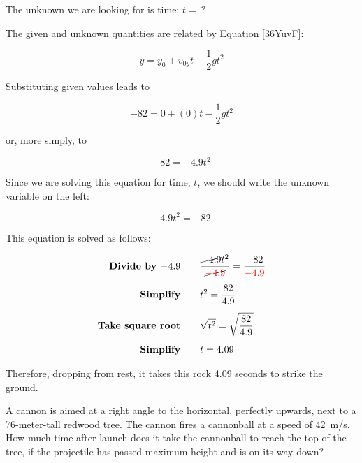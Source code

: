 \documentclass[dvipsnames]{article}
\numberwithin{equation}{section}
\numberwithin{figure}{section}
\begin{document}
\vspace{1em}

The unknown we are looking for is time: $t =\ ?$

\vspace{1em}

The given and unknown quantities are related by Equation \eqref{36YuvF}:

\begin{equation*}
    y = y_0 + v_{0y}t - \frac{1}{2}  g t^2
\end{equation*}

Substituting given values leads to 

\begin{equation*}
    -82 = 0 + (0) t - \frac{1}{2} g t^2
\end{equation*}

or, more simply, to

\begin{equation*}
    -82 = - 4.9 t^2
\end{equation*}

Since we are solving this equation for time, $t$, we should write the unknown variable on the left:

\begin{equation*}
    -4.9 t^2 = -82
\end{equation*}

This equation is solved as follows:

\begin{align*}
    \textbf{Divide by $-4.9$} \qquad & \frac{\cancel{-4.9} t^2}{\cancel{\mathbin{\color{red} -} \textcolor{red}{4.9}}} = \frac{-82}{\mathbin{\color{red} -} \textcolor{red}{4.9}}\\[1ex]
    \textbf{Simplify} \qquad & t^2 = \frac{82}{4.9}\\[1ex]
    \textbf{Take square root} \qquad & \sqrt{t^2} = \sqrt{\frac{82}{4.9}}\\[1ex]
    \textbf{Simplify} \qquad & t = 4.09
\end{align*}

Therefore, dropping from rest, it takes this rock 4.09 seconds to strike the ground.

\solutionEnd


\begin{example} \label{lB7EDG}
    A cannon is aimed at a right angle to the horizontal, perfectly upwards, next to a 76-meter-tall redwood tree. The cannon fires a cannonball at a speed of \SI{42}{m/s}. How much time after launch does it take the cannonball to reach the top of the tree, if the projectile has passed maximum height and is on its way down?
\end{example}
\end{document}
